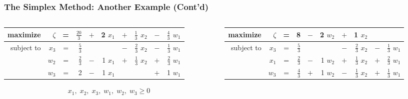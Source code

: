 \documentclass[usenames,dvipsnames,8pt]{beamer}%
\begin{document}
\begin{frame}
  \frametitle{The Simplex Method: Another Example (Cont'd)}
  \begin{columns}
    \begin{column}{0.5\textwidth}
      \begin{table}[ht]
        \centering
        \setlength\tabcolsep{2pt}
        \begin{tabular}{rrcrcrcrcr}
          \toprule
          maximize   &$\zeta$& = & $\frac{20}{3}$ &\cellcolor{C2}\color{white}  $+$ &\cellcolor{C2}\color{white}  2 $x_1$ & $+$ & $\frac{1}{3}$ $x_2$ & $-$ & $\frac{4}{3}$ $w_1$ \\
          \midrule
          subject to & $x_3$ & = & $\frac{5}{3}$ &     &           & $-$ & $\frac{2}{3}$ $x_2$ & $-$ & $\frac{1}{3}$ $w_1$ \\ 
                     & $w_2$ & = & $\frac{2}{3}$ & $-$ & 1   $x_1$ & $+$ & $\frac{1}{3}$ $x_2$ & $+$ & $\frac{2}{3}$ $w_1$ \\
                     & $w_3$ & = & 2 & $-$ & 1 $x_1$ &  &  & $+$ & 1 $w_1$ \\
          \bottomrule
        \end{tabular}
      \end{table}
      \vspace{-0.4cm}
      \begin{align*}
        x_1,\;x_2,\;x_3,\;w_1,\;w_2,\;w_3\geqslant 0
      \end{align*}
    \end{column}
    \begin{column}{0.5\textwidth}
      \begin{table}[ht]
        \centering
        \setlength\tabcolsep{2pt}
        \begin{tabular}{rrcrcrcrcr}
          \toprule
          maximize   &$\zeta$& = &  8 & $-$ & 2 $w_2$ & $+$ & 1 $x_2$ &  &  \\
          \midrule
          subject to & $x_3$ & = & $\frac{5}{3}$ &     &           & $-$ & $\frac{2}{3}$ $x_2$ & $-$ & $\frac{1}{3}$ $w_1$ \\ 
                     & $x_1$ & = & $\frac{2}{3}$ & $-$ & 1   $w_2$ & $+$ & $\frac{1}{3}$ $x_2$ & $+$ & $\frac{2}{3}$ $w_1$ \\
                     & $w_3$ & = & $\frac{4}{3}$ & $+$ & 1 $w_2$ & $-$ & $\frac{1}{3}$ $x_2$ & $+$ & $\frac{1}{3}$ $w_1$ \\
          \bottomrule
        \end{tabular}
      \end{table}

\end{column}
\end{columns}
\end{frame}
\end{document}
